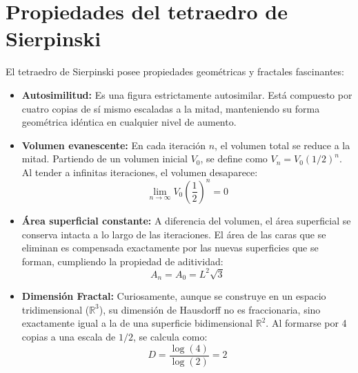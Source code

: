 \section*{Propiedades del tetraedro de Sierpinski}

El tetraedro de Sierpinski posee propiedades geométricas y fractales fascinantes:

\begin{itemize}
    \item \textbf{Autosimilitud:} Es una figura estrictamente autosimilar. Está compuesto por cuatro copias de sí mismo escaladas a la mitad, manteniendo su forma geométrica idéntica en cualquier nivel de aumento.
    
    \item \textbf{Volumen evanescente:} En cada iteración $n$, el volumen total se reduce a la mitad. Partiendo de un volumen inicial $V_{0}$, se define como $V_{n}= V_{0}(1/2)^{n}$. Al tender a infinitas iteraciones, el volumen desaparece:
    \begin{equation*}
        \lim_{n \to \infty } V_{0}\left(\frac{1}{2}\right)^{n} = 0
    \end{equation*}
    
    \item \textbf{Área superficial constante:} A diferencia del volumen, el área superficial se conserva intacta a lo largo de las iteraciones. El área de las caras que se eliminan es compensada exactamente por las nuevas superficies que se forman, cumpliendo la propiedad de aditividad:
    \begin{equation*}
        A_{n} = A_{0} = L^{2}\sqrt{3}
    \end{equation*}
    
    \item \textbf{Dimensión Fractal:} Curiosamente, aunque se construye en un espacio tridimensional ($\mathbb{R}^3$), su dimensión de Hausdorff no es fraccionaria, sino exactamente igual a la de una superficie bidimensional $ \mathbb{R}^{2}$. Al formarse por 4 copias a una escala de $1/2$, se calcula como:
    \begin{equation*}
        D = \frac{\log(4)}{\log(2)} = 2
    \end{equation*}
\end{itemize}